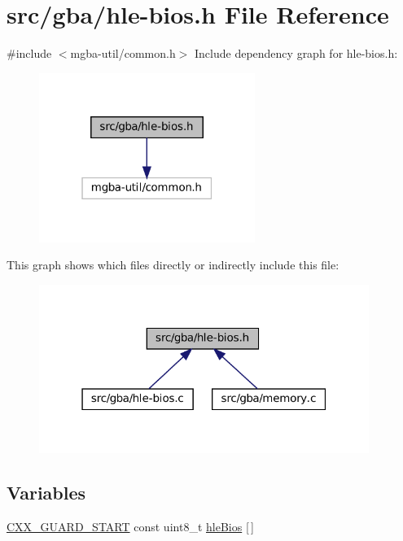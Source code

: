 \hypertarget{hle-bios_8h}{}\section{src/gba/hle-\/bios.h File Reference}
\label{hle-bios_8h}
{\ttfamily \#include $<$mgba-\/util/common.\+h$>$}\newline
Include dependency graph for hle-\/bios.h\+:
\nopagebreak
\begin{figure}[H]
\begin{center}
\leavevmode
\includegraphics[width=199pt]{hle-bios_8h__incl}
\end{center}
\end{figure}
This graph shows which files directly or indirectly include this file\+:
\nopagebreak
\begin{figure}[H]
\begin{center}
\leavevmode
\includegraphics[width=304pt]{hle-bios_8h__dep__incl}
\end{center}
\end{figure}
\subsection*{Variables}
\begin{DoxyCompactItemize}
\item 
\mbox{\hyperlink{__builder_8h_af721f4bd9a2c3267a89d3967b3ca1747}{C\+X\+X\+\_\+\+G\+U\+A\+R\+D\+\_\+\+S\+T\+A\+RT}} const uint8\+\_\+t \mbox{\hyperlink{hle-bios_8h_af15b38ffe83c549fd7f536f907479852}{hle\+Bios}} \mbox{[}$\,$\mbox{]}
\end{DoxyCompactItemize}


